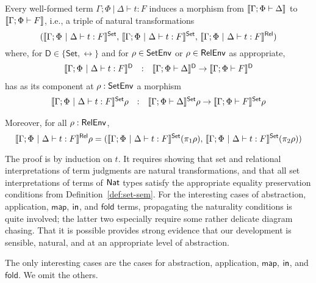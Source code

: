 \documentclass{lmcs}
\theoremstyle{plain}\newtheorem{satz}[thm]{Satz}
\newcommand{\fold}{\mathsf{fold}}
\newcommand{\set}{\mathsf{Set}}
\newcommand{\map}{\mathsf{map}}
\begin{document}
{\begin{thm}\label{thm:at-gen}
Every well-formed term $\Gamma;\Phi~|~\Delta \vdash t : F$ induces
a morphism from $\llbracket{\Gamma; \Phi \vdash \Delta}\rrbracket$ to
$\llbracket{\Gamma; \Phi \vdash F}\rrbracket$, i.e., a triple of natural
transformations 
\[(\setsem{\Gamma;\Phi~|~\Delta \vdash t : F},\,
\setsem{\Gamma;\Phi~|~\Delta \vdash t : F},\,
\relsem{\Gamma;\Phi~|~\Delta \vdash t : F})\]
where, for $\mathsf{D} \in \{\set,\rel\}$ and for $\rho \in \mathsf{SetEnv}$
or $\rho \in \mathsf{RelEnv}$ as appropriate,
\[\begin{array}{lll}
\llbracket{\Gamma;\Phi~|~\Delta \vdash t : F}\rrbracket^{\mathsf D} & : & \llbracket{\Gamma;
  \Phi \vdash \Delta}\rrbracket^{\mathsf D} \to \llbracket{\Gamma; \Phi \vdash F}\rrbracket^{\mathsf D}
\end{array}\]
has as its component at $\rho : \mathsf{SetEnv}$ a morphism
\[\begin{array}{lll}
\setsem{\Gamma;\Phi~|~\Delta \vdash t : F}\rho & : & \setsem{\Gamma;
  \Phi \vdash \Delta}\rho \to \setsem{\Gamma; \Phi \vdash F}\rho
\end{array}\]

Moreover, for all $\rho : \mathsf{RelEnv}$, 
\begin{equation}\label{eq:projs}
\relsem{\Gamma;\Phi~|~\Delta \vdash t : F}\rho =
(\setsem{\Gamma;\Phi~|~\Delta \vdash t : F}(\pi_1 \rho),\,
\setsem{\Gamma;\Phi~|~\Delta \vdash t : F}(\pi_2 \rho))
\end{equation}
\end{thm}
\proof The proof is by induction on $t$. It requires showing that set
and relational interpretations of term judgments are natural
transformations, and that all set interpretations of terms of $\mathsf{Nat}$
types satisfy the appropriate equality preservation conditions from
Definition~\ref{def:set-sem}.  For the interesting cases of
abstraction, application, $\map$, $\mathsf{in}$, and $\mathsf{fold}$ terms,
propagating the naturality conditions is quite involved; the latter
two especially require some rather delicate diagram chasing. That it
is possible provides strong evidence that our development is sensible,
natural, and at an appropriate level of abstraction.

The only interesting cases are the cases for abstraction, application,
$\map$, $\mathsf{in}$, and $\fold$. We omit the others.

}
\end{document}
